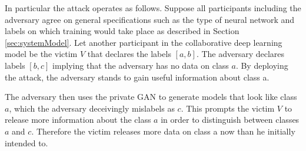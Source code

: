 \documentclass[conference]{IEEEtran}
\begin{document}




In particular the attack operates as follows. Suppose all participants including the adversary agree on general specifications such as
the type of neural network and labels on which training would take place as described in Section \ref{sec:systemModel}. Let another
participant in the collaborative deep learning
model be the victim $V$ that declares the labels $[a,b]$. The adversary declares labels $[b,c]$ implying that the adversary has no data
on class $a$. By deploying the attack, the adversary stands to gain useful information about class a.

The adversary then uses the private GAN to generate models that look like class $a$, which the adversary deceivingly mislabels as $c$.
This prompts the victim  $V$ to release more information about the class $a$ in order to distinguish between classes 
$a$ and $c$. Therefore the victim releases more data on class a now than he initially intended to.
\end{document}
